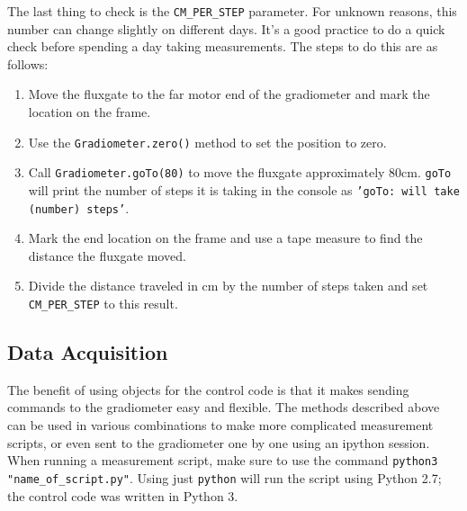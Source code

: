 \documentclass{TheMartianReport}
\newcommand{\pyinline}[1]{\texttt{#1}}
\newcommand{\shellinline}[1]{\texttt{#1}}
\begin{document}
The last thing to check is the \pyinline{CM_PER_STEP} parameter. For unknown reasons, this number can change slightly on different days. It's a good practice to do a quick check before spending a day taking measurements. The steps to do this are as follows:
\begin{enumerate}
	\item Move the fluxgate to the far motor end of the gradiometer and mark the location on the frame.
	\item Use the \pyinline{Gradiometer.zero()} method to set the position to zero.
	\item Call \pyinline{Gradiometer.goTo(80)} to move the fluxgate approximately 80cm. \pyinline{goTo} will print the number of steps it is taking in the console as \shellinline{'goTo: will take (number) steps'}.
	\item Mark the end location on the frame and use a tape measure to find the distance the fluxgate moved.
	\item Divide the distance traveled in cm by the number of steps taken and set \pyinline{CM_PER_STEP} to this result.
\end{enumerate}

\subsection{Data Acquisition} \label{subsec:Acquisition}
The benefit of using objects for the control code is that it makes sending commands to the gradiometer easy and flexible. The methods described above can be used in various combinations to make more complicated measurement scripts, or even sent to the gradiometer one by one using an ipython session. When running a measurement script, make sure to use the command \shellinline{python3 "name_of_script.py"}. Using just \shellinline{python} will run the script using Python 2.7; the control code was written in Python 3.
\end{document}
